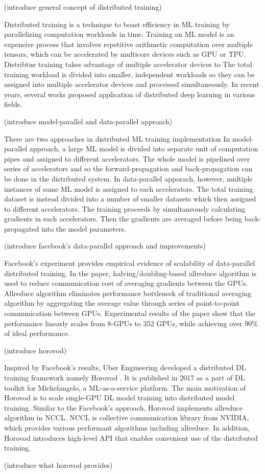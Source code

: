 (introduce general concept of distributed training)

Distributed training is a technique to boast efficiency in ML training
by parallelizing computation workloads in time.
Training an ML model is an expensive process that involves repetitive
arithmetic computation over multiple tensors,
which can be accelerated by multicore devices such as GPU or TPU. 
Distribtue training takes advantage of multiple accelerator devices to
The total training workload is divided into smaller, independent workloads
so they can be assigned into multiple accelerator devices and
processed simultaneously. 
In recent years, several works proposed application of distributed
deep learning in various fields.

(introduce model-parallel and data-parallel approach\cite{approaches2019Mao})

There are two approaches in distributed ML training implementation
In model-parallel approach, a large ML model is divided into separate unit
of computation pipes and assigned to different accelerators. The whole model
is pipelined over series of accelerators and so the forward-propagation and
back-propagation can be done in the distributed system.
In data-parallel apporach, however, multiple instances of same ML model
is assigned to each accelerators. The total training dataset is instead
divided into a number of smaller datasets which then assigned to different
accelerators. The training proceeds by simultaneously calculating gradients
in each accelerators. Then the gradients are averaged before being 
back-propagated into the model parameters.

(introduce facebook's data-parallel approach and improvements)

Facebook's experiment \cite{facebook2018} provides empirical evidence of
scalability of data-parallel distributed training. In the paper, 
halving/doubling-based allreduce algorithm is used to reduce communication cost 
of averaging gradients between the GPUs. 
Allreduce algorithm eliminates performance bottleneck of traditional
averaging algorithm by aggregating the average value through series of
point-to-point communication between GPUs. 
Experimental results of the paper show that the performance linearly
scales from 8-GPUs to 352 GPUs, while achieving over 90\% of ideal performance.

(introduce horovod)

Inspired by Facebook's results, Uber Engineering developed a distributed DL
training framework namely Horovod \cite{sergeev2018horovod}. It is published in
2017 as a part of DL toolkit for Michelangelo, a ML-as-a-service platform.
The main motivation of Horovod is to scale single-GPU DL model training
into distributed model training. Similar to the Facebook's approach,
Horovod implements allreduce algorithm in NCCL. NCCL is collective communication
library from NVIDIA, which provides various performant algorithms including
allreduce. In addition, Horovod introduces high-level API that enables
convenient use of the distributed training.  

(introduce what horovod provides)
